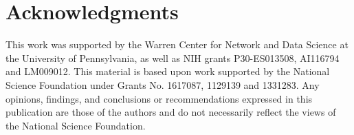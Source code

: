 \documentclass[twoside]{article}
\begin{document}
\section{Acknowledgments}
This work was supported by the Warren Center for Network and Data Science at the University of Pennsylvania, as well as NIH grants P30-ES013508, AI116794 and LM009012. This material is based upon work supported by the National Science Foundation under Grants No. 1617087, 1129139 and 1331283. Any opinions, findings, and conclusions or recommendations expressed in this publication are those of the authors and do not necessarily reflect the views of the National Science Foundation.




\end{document}
